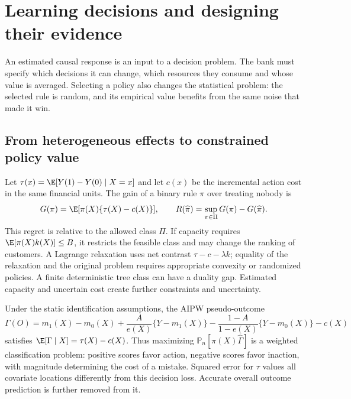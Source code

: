 \chapter{Learning decisions and designing their evidence}
\label{r3:decision-learning}
An estimated causal response is an input to a decision problem. The
bank must specify which decisions it can change, which resources they
consume and whose value is averaged. Selecting a policy also changes
the statistical problem: the selected rule is random, and its empirical
value benefits from the same noise that made it win.

\section{From heterogeneous effects to constrained policy value}
\label{r3:policy-regret}
Let $\tau(x)=\E[Y(1)-Y(0)\mid X=x]$ and let $c(x)$ be the
incremental action cost in the same financial units. The gain of a
binary rule $\pi$ over treating nobody is
\[
 G(\pi)=\E[\pi(X)\{\tau(X)-c(X)\}],\qquad
 R(\widehat\pi)=\sup_{\pi\in\Pi}G(\pi)-G(\widehat\pi).
\]
This regret is relative to the allowed class $\Pi$. If capacity requires
$\E[\pi(X)k(X)]\le B$, it restricts the feasible class and may change
the ranking of customers. A Lagrange relaxation uses net contrast
$\tau-c-\lambda k$; equality of the relaxation and the original
problem requires appropriate convexity or randomized policies. A
finite deterministic tree class can have a duality gap. Estimated
capacity and uncertain cost create further constraints and uncertainty.

Under the static identification assumptions, the AIPW pseudo-outcome
\[
 \Gamma(O)=m_1(X)-m_0(X)
   +\frac{A}{e(X)}\{Y-m_1(X)\}
   -\frac{1-A}{1-e(X)}\{Y-m_0(X)\}-c(X)
\]
satisfies $\E[\Gamma\mid X]=\tau(X)-c(X)$. Thus maximizing
$\mathbb P_n[\pi(X)\widehat\Gamma]$ is a weighted classification
problem: positive scores favor action, negative scores favor inaction,
with magnitude determining the cost of a mistake. Squared error for
$\tau$ values all covariate locations differently from this decision
loss. Accurate overall outcome prediction is further removed from it.

